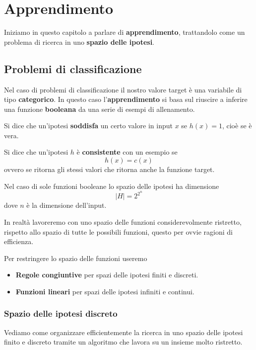 \chapter{Apprendimento}
Iniziamo in questo capitolo a parlare di \textbf{apprendimento}, trattandolo come un problema di ricerca in uno
\textbf{spazio delle ipotesi}.

\section{Problemi di classificazione}
Nel caso di problemi di classificazione il nostro valore target \`e una variabile di tipo \textbf{categorico}. In questo
caso l'\textbf{apprendimento} si basa sul riuscire a inferire una funzione \textbf{booleana} da una serie di
esempi di allenamento.

\begin{definition}
	Si dice che un'ipotesi \textbf{soddisfa} un certo valore in input $x$ se $h(x) = 1$, cio\`e se \`e vera.
\end{definition}

\begin{definition}
	Si dice che un'ipotesi $h$ \`e \textbf{consistente} con un esempio se
	\[ h(x) = c(x) \]
	ovvero se ritorna gli stessi valori che ritorna anche la funzione target.
\end{definition}

Nel caso di sole funzioni booleane lo spazio delle ipotesi ha dimensione
\[ |H| = 2^{2^n} \]
dove $n$ \`e la dimensione dell'input.

In realt\`a lavoreremo con uno spazio delle funzioni considerevolmente ristretto, rispetto allo spazio di tutte le
possibili funzioni, questo per ovvie ragioni di efficienza.

Per restringere lo spazio delle funzioni useremo
\begin{itemize}
	\item \textbf{Regole congiuntive} per spazi delle ipotesi finiti e discreti.
	\item \textbf{Funzioni lineari} per spazi delle ipotesi infiniti e continui.
\end{itemize}

\subsection{Spazio delle ipotesi discreto}
Vediamo come organizzare efficientemente la ricerca in uno spazio delle ipotesi finito e discreto tramite un algoritmo che
lavora su un insieme molto ristretto.

